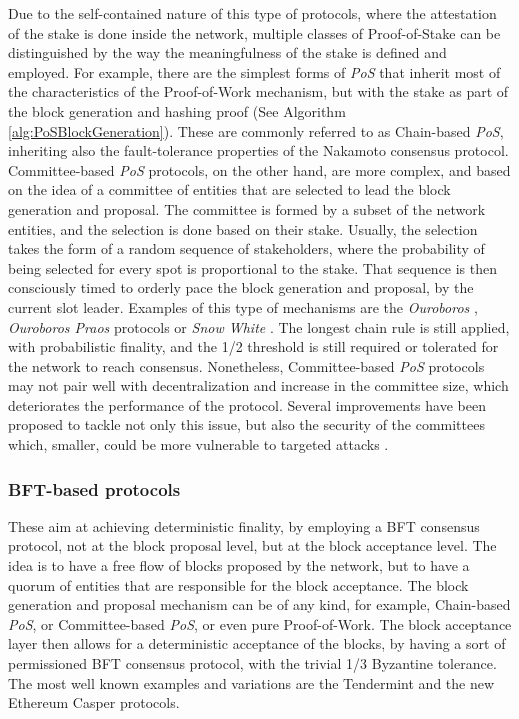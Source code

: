\documentclass[journal]{IEEEtran}
\begin{document}
Due to the self-contained nature of this type of protocols, where the
attestation of the stake is done inside the network, multiple classes
of Proof-of-Stake can be distinguished by the way the meaningfulness of
the stake is defined and employed. For example, there are the simplest forms of \emph{PoS} that inherit most
of the characteristics of the Proof-of-Work mechanism, but with the
stake as part of the block generation and hashing proof (See Algorithm \ref{alg:PoSBlockGeneration}).
These are commonly referred to as Chain-based \emph{PoS}, inheriting also the
fault-tolerance properties of the Nakamoto consensus protocol.
Committee-based \emph{PoS} protocols, on the other hand, are more complex,
and based on the idea of a committee of entities that are 
selected to lead the block generation and proposal. The committee is
formed by a subset of the network entities, and the selection is done
based on their stake. Usually, the selection takes the form of a random
sequence of stakeholders, where the probability of being selected
for every spot is proportional to the stake. That sequence is then 
consciously timed to orderly pace the block generation and proposal, 
by the current slot leader. Examples of this type of mechanisms are
the \emph{Ouroboros} \cite{kiayias2017ouroboros}, \emph{Ouroboros Praos} \cite{david2018ouroboros} protocols
or \emph{Snow White} \cite{daian2019snow}. The longest chain rule is
still applied, with probabilistic finality, and the 1/2 threshold is
still required or tolerated for the network to reach consensus. Nonetheless,
Committee-based \emph{PoS} protocols may not pair well with decentralization and 
increase in the committee size, which deteriorates the performance of the
protocol. Several improvements have been proposed to tackle not only this
issue, but also the security of the committees which, smaller, could be more
vulnerable to targeted attacks \cite{david2018ouroboros}.
  
\subsubsection{BFT-based protocols}

These aim at achieving deterministic finality, by employing a BFT
consensus protocol, not at the block proposal level, but at the
block acceptance level. The idea is to have a free flow of blocks
proposed by the network, but to have a quorum of entities that
are responsible for the block acceptance. The block generation and proposal mechanism
can be of any kind, for example, Chain-based \emph{PoS}, or Committee-based \emph{PoS},
or even pure Proof-of-Work. The block acceptance layer then allows
for a deterministic acceptance of the blocks, by having a sort of permissioned
BFT consensus protocol, with the trivial 1/3 Byzantine tolerance. The most well known examples
and variations are the Tendermint \cite{buchman2016tendermint} and the new Ethereum Casper 
\cite{buterin2017casper} protocols.
\end{document}

